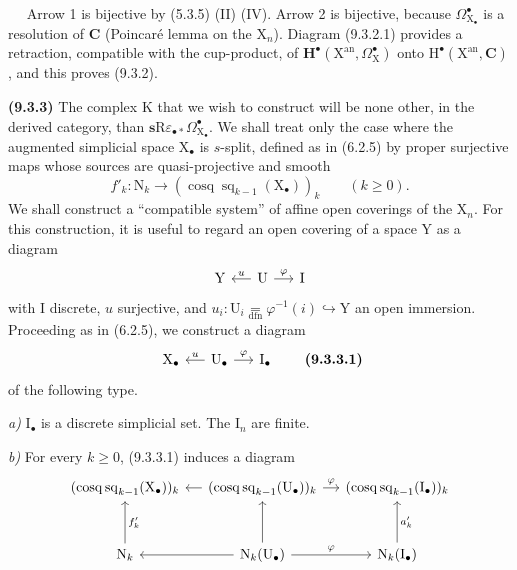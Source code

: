\documentclass[11pt,leqno]{article}
\newcommand{\Page}[1]{\ifvmode\noindent\else\unskip\ \fi{\footnotesize\textcolor{gray}{[p.\,#1]}}\ \ignorespaces}
\begin{document}
\Page{51}
Arrow 1 is bijective by (5.3.5) (II) (IV). Arrow 2 is bijective, because \(\Omega_{\mathrm{X}_{\bullet}}^{\bullet}\) is a resolution of \(\mathbf{C}\) (Poincaré lemma on the \(\mathrm{X}_{n}\)). Diagram (9.3.2.1) provides a retraction, compatible with the cup-product, of \(\mathbf{H}^{\bullet}(\mathrm{X}^{\mathrm{an}},\Omega_{\mathrm{X}}^{\bullet})\) onto \(\mathrm{H}^{\bullet}(\mathrm{X}^{\mathrm{an}},\mathbf{C})\), and this proves (9.3.2).

\textbf{(9.3.3)} The complex \(\mathrm{K}\) that we wish to construct will be none other, in the derived category, than \(\mathbf{s}\mathrm{R}\varepsilon_{\bullet *}\Omega_{\mathrm{X}_{\bullet}}^{\bullet}\). We shall treat only the case where the augmented simplicial space \(\mathrm{X}_{\bullet}\) is \(s\)-split, defined as in (6.2.5) by proper surjective maps whose sources are quasi-projective and smooth
\[
f'_{k}:\mathrm{N}_{k}\to
(\operatorname{cosq}\operatorname{sq}_{k-1}(\mathrm{X}_{\bullet}))_{k}
\qquad(k\geq0).
\]
We shall construct a “compatible system” of affine open coverings of the \(\mathrm{X}_{n}\). For this construction, it is useful to regard an open covering of a space \(\mathrm{Y}\) as a diagram
\[
\begin{tikzcd}[ampersand replacement=\&, column sep=1.4em]
\mathrm{Y}
\&
\mathrm{U}\arrow[l, "u"']\arrow[r, "\varphi"]
\&
\mathrm{I}
\end{tikzcd}
\]
with \(\mathrm{I}\) discrete, \(u\) surjective, and \(u_{i}:\mathrm{U}_{i}\underset{\mathrm{dfn}}{=}\varphi^{-1}(i)\hookrightarrow\mathrm{Y}\) an open immersion. Proceeding as in (6.2.5), we construct a diagram
\[
\begin{tikzcd}[ampersand replacement=\&, column sep=1.4em]
\mathrm{X}_{\bullet}
\&
\mathrm{U}_{\bullet}\arrow[l, "u"']\arrow[r, "\varphi"]
\&
\mathrm{I}_{\bullet}
\end{tikzcd}
\tag*{\textbf{(9.3.3.1)}}
\]
of the following type.

\textit{a)} \(\mathrm{I}_{\bullet}\) is a discrete simplicial set. The \(\mathrm{I}_{n}\) are finite.

\textit{b)} For every \(k\geq0\), (9.3.3.1) induces a diagram
\[
\begin{tikzcd}[ampersand replacement=\&, column sep=1.2em, row sep=3em]
(\operatorname{cosq}\operatorname{sq}_{k-1}(\mathrm{X}_{\bullet}))_{k}
\&
(\operatorname{cosq}\operatorname{sq}_{k-1}(\mathrm{U}_{\bullet}))_{k}
  \arrow[l]\arrow[r, "\varphi"]
\&
(\operatorname{cosq}\operatorname{sq}_{k-1}(\mathrm{I}_{\bullet}))_{k}
\\
\mathrm{N}_{k}\arrow[u, "f'_{k}"']
\&
\mathrm{N}_{k}(\mathrm{U}_{\bullet})
  \arrow[l]\arrow[u]\arrow[r, "\varphi"]
\&
\mathrm{N}_{k}(\mathrm{I}_{\bullet})\arrow[u, "a'_{k}"']
\end{tikzcd}
\]
\end{document}

